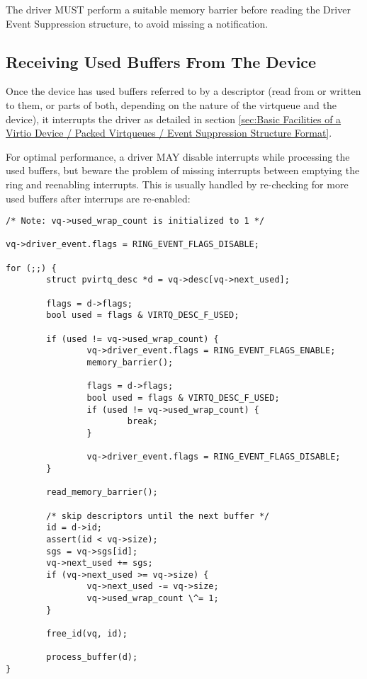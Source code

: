 The driver MUST perform a suitable memory barrier before reading
the Driver Event Suppression structure, to avoid missing a notification.

\subsection{Receiving Used Buffers From The Device}\label{sec:Basic Facilities of a Virtio Device / Packed Virtqueues / Receiving Used Buffers From The Device}

Once the device has used buffers referred to by a descriptor (read from or written to them, or
parts of both, depending on the nature of the virtqueue and the
device), it interrupts the driver
as detailed in section \ref{sec:Basic
Facilities of a Virtio Device / Packed Virtqueues / Event
Suppression Structure Format}.

\begin{note}
For optimal performance, a driver MAY disable interrupts while processing
the used buffers, but beware the problem of missing interrupts between
emptying the ring and reenabling interrupts.  This is usually handled by
re-checking for more used buffers after interrups are re-enabled:
\end{note}

\begin{lstlisting}
/* Note: vq->used_wrap_count is initialized to 1 */

vq->driver_event.flags = RING_EVENT_FLAGS_DISABLE;

for (;;) {
        struct pvirtq_desc *d = vq->desc[vq->next_used];

        flags = d->flags;
        bool used = flags & VIRTQ_DESC_F_USED;

        if (used != vq->used_wrap_count) {
                vq->driver_event.flags = RING_EVENT_FLAGS_ENABLE;
                memory_barrier();

                flags = d->flags;
                bool used = flags & VIRTQ_DESC_F_USED;
                if (used != vq->used_wrap_count) {
                        break;
                }

                vq->driver_event.flags = RING_EVENT_FLAGS_DISABLE;
        }

        read_memory_barrier();

        /* skip descriptors until the next buffer */
        id = d->id;
        assert(id < vq->size);
        sgs = vq->sgs[id];
        vq->next_used += sgs;
        if (vq->next_used >= vq->size) {
                vq->next_used -= vq->size;
                vq->used_wrap_count \^= 1;
        }

        free_id(vq, id);

        process_buffer(d);
}
\end{lstlisting}
